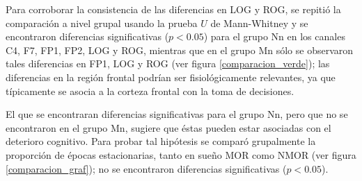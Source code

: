 
Para corroborar la consistencia de las diferencias en LOG y ROG, se repitió la comparación a nivel 
grupal usando la prueba $U$ de  Mann-Whitney
y se encontraron diferencias significativas ($p<0.05$) para el grupo Nn en los canales C4, F7, FP1, 
FP2, LOG y ROG, mientras que en el grupo Mn sólo se observaron tales diferencias en FP1, LOG y ROG 
(ver figura \ref{comparacion_verde});
las diferencias en la región frontal podrían ser fisiológicamente relevantes, ya que típicamente se 
asocia a la corteza frontal con la toma de decisiones.

El que se encontraran diferencias significativas para el grupo Nn, pero que no se encontraron en el
grupo Mn, sugiere que éstas pueden estar asociadas con el deterioro cognitivo.
Para probar tal hipótesis se comparó grupalmente la proporción de épocas estacionarias, tanto en
sueño MOR como NMOR (ver figura \ref{comparacion_graf}); no se encontraron diferencias
significativas ($p<0.05$).

